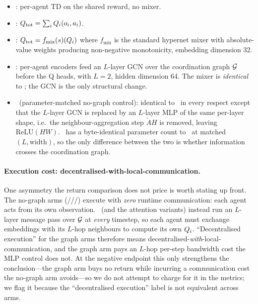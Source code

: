 \begin{itemize}[leftmargin=*,itemsep=0pt,topsep=2pt]
  \item \iql: per-agent TD on the shared reward, no mixer.
  \item \vdn: $Q_{\mathrm{tot}} = \sum_i Q_i(o_i, a_i)$.
  \item \qmix: $Q_{\mathrm{tot}} = f_{\text{mix}}(s)(Q_i)$ where $f_{\text{mix}}$ is the
        standard hypernet mixer with absolute-value weights producing
        non-negative monotonicity, embedding dimension 32.
  \item \gnnqmix: per-agent encoders feed an $L$-layer GCN over the
        coordination graph $\mathcal{G}$ before the Q heads, with $L=2$,
        hidden dimension 64. The mixer is \emph{identical} to \qmix; the
        GCN is the only structural change.
  \item \mlpqmix\ (parameter-matched no-graph control): identical to
        \gnnqmix\ in every respect except that the $L$-layer GCN is
        replaced by an $L$-layer MLP of the same per-layer shape, i.e.\ the neighbour-aggregation step $\tilde A H$ is removed,
        leaving $\mathrm{ReLU}(HW)$. \mlpqmix\ has a byte-identical
        parameter count to \gnnqmix\ at matched $(L, \text{width})$, so
        the only difference between the two is whether information
        crosses the coordination graph.
\end{itemize}

\paragraph{Execution cost: decentralised-with-local-communication.}
One asymmetry the return comparison does not price is worth stating up front.
The no-graph arms (\iql/\vdn/\qmix/\mlpqmix) execute with \emph{zero} runtime
communication: each agent acts from its own observation. \gnnqmix\ (and the
attention variants) instead run an $L$-layer message pass over $\mathcal{G}$ at
\emph{every} timestep, so each agent must exchange embeddings with its $L$-hop
neighbours to compute its own $Q_i$. ``Decentralised execution'' for the graph
arms therefore means decentralised-\emph{with}-local-communication, and the
graph arm pays an $L$-hop per-step bandwidth cost the MLP control does not. At
the negative endpoint this only strengthens the conclusion---the graph arm buys
no return while incurring a communication cost the no-graph arm avoids---so we
do not attempt to charge for it in the metrics; we flag it because the
``decentralised execution'' label is not equivalent across arms.

